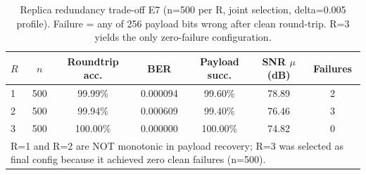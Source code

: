\begin{table}[t]
\centering
\caption{Replica redundancy trade-off E7 (n=500 per R, joint selection, delta=0.005 profile). Failure = any of 256 payload bits wrong after clean round-trip. R=3 yields the only zero-failure configuration.}
\label{tab:redundancy-e7}
\scriptsize
\begin{tabular}{lcccccc}
\toprule
\textbf{$R$} & \textbf{$n$} & \textbf{Roundtrip acc.} & \textbf{BER} & \textbf{Payload succ.} & \textbf{SNR $\mu$ (dB)} & \textbf{Failures} \\
\midrule
1 & 500 & 99.99\% & 0.000094 & 99.60\% & 78.89 & 2 \\
2 & 500 & 99.94\% & 0.000609 & 99.40\% & 76.46 & 3 \\
3 & 500 & 100.00\% & 0.000000 & 100.00\% & 74.82 & 0 \\
\bottomrule
\multicolumn{7}{l}{\footnotesize R=1 and R=2 are NOT monotonic in payload recovery; R=3 was selected as final config because it achieved zero clean failures (n=500).}\\
\end{tabular}
\end{table}
